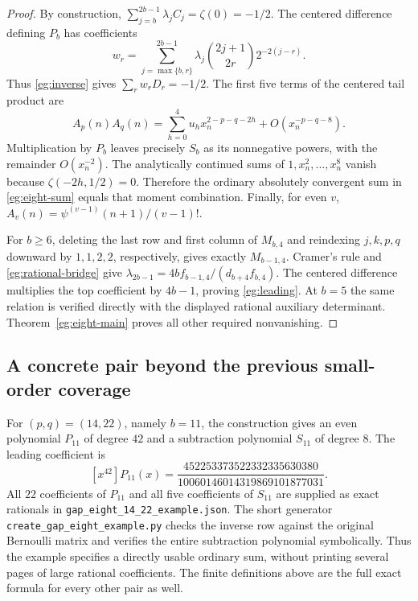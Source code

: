 \documentclass[11pt,a4paper]{article}
\numberwithin{equation}{section}
\theoremstyle{definition}
\theoremstyle{remark}
\begin{document}
\begin{proof}
By construction, $\sum_{j=b}^{2b-1}\lambda_j C_j=\zeta(0)=-1/2$.
The centered difference defining $P_b$ has coefficients
\[
 w_r=\sum_{j=\max\{b,r\}}^{2b-1}
       \lambda_j\binom{2j+1}{2r}2^{-2(j-r)}.
\]
Thus \eqref{eg:inverse} gives $\sum_rw_rD_r=-1/2$.
The first five terms of the centered tail product are
\[
 A_p(n)A_q(n)=\sum_{h=0}^4u_hx_n^{2-p-q-2h}
                      +O(x_n^{-p-q-8}).
\]
Multiplication by $P_b$ leaves precisely $S_b$ as its nonnegative
powers, with the remainder $O(x_n^{-2})$.  The analytically
continued sums of $1,x_n^2,\ldots,x_n^8$ vanish because
$\zeta(-2h,1/2)=0$.  Therefore the ordinary absolutely convergent
sum in \eqref{eg:eight-sum} equals that moment combination.
Finally, for even $v$,
$A_v(n)=\psi^{(v-1)}(n+1)/(v-1)!$.

For $b\ge6$, deleting the last row and first column of $M_{b,4}$
and reindexing $j,k,p,q$ downward by $1,1,2,2$, respectively,
gives exactly $M_{b-1,4}$.  Cramer's rule and
\eqref{eg:rational-bridge} give
$\lambda_{2b-1}=4b f_{b-1,4}/(d_{b+4}f_{b,4})$.
The centered difference multiplies the top coefficient by $4b-1$,
proving \eqref{eg:leading}.  At $b=5$ the same relation is
verified directly with the displayed rational auxiliary determinant.
Theorem~\ref{eg:eight-main} proves all other required nonvanishing.
\end{proof}


\subsection{A concrete pair beyond the previous small-order coverage}

For $(p,q)=(14,22)$, namely $b=11$, the construction gives an even
polynomial $P_{11}$ of degree $42$ and a subtraction polynomial
$S_{11}$ of degree $8$. The leading coefficient is
\[
 [x^{42}]P_{11}(x)=
 \frac{452253373522332335630380}{10060146014319869101877031}.
\]
All $22$ coefficients of $P_{11}$ and all five coefficients of
$S_{11}$ are supplied as exact rationals in
\texttt{gap\_eight\_14\_22\_example.json}.
The short generator \texttt{create\_gap\_eight\_example.py} checks
the inverse row against the original Bernoulli matrix and verifies
the entire subtraction polynomial symbolically. Thus the example
specifies a directly usable ordinary sum, without printing several
pages of large rational coefficients. The finite definitions above
are the full exact formula for every other pair as well.

\end{document}
